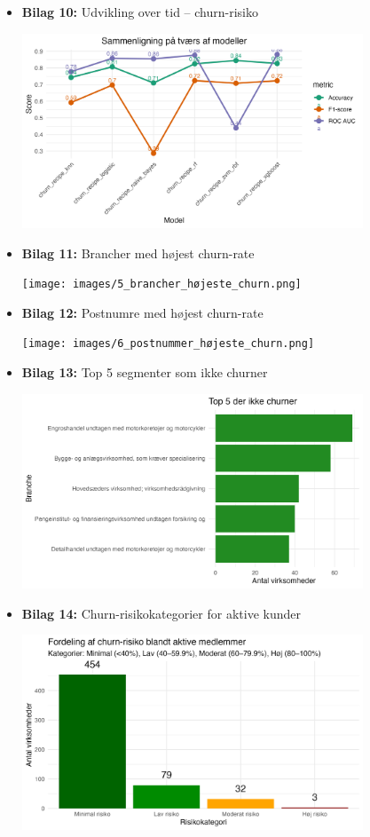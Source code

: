 \documentclass[
  11pt,
  letterpaper,
  DIV=11,
  numbers=noendperiod]{scrartcl}
\begin{document}
\begin{itemize}
\begin{center}
  \end{center}
\item
  \textbf{Bilag 10:} Udvikling over tid -- churn-risiko \begin{center}
  \includegraphics[width=0.8\textwidth,height=\textheight]{images/2_linje_plot.png}
  \end{center}
\item
  \textbf{Bilag 11:} Brancher med højest churn-rate \begin{center}
  \texttt{[image: images/5\_brancher\_højeste\_churn.png]}
  \end{center}
\item
  \textbf{Bilag 12:} Postnumre med højest churn-rate \begin{center}
  \texttt{[image: images/6\_postnummer\_højeste\_churn.png]}
  \end{center}
\item
  \textbf{Bilag 13:} Top 5 segmenter som ikke churner \begin{center}
  \includegraphics[width=0.8\textwidth,height=\textheight]{images/7_top5_der_ikke_churner.png}
  \end{center}
\item
  \textbf{Bilag 14:} Churn-risikokategorier for aktive kunder
  \begin{center}
  \includegraphics[width=0.8\textwidth,height=\textheight]{images/9_churn_risikokategorier_aktive.png}

\end{center}
\end{itemize}
\end{document}
